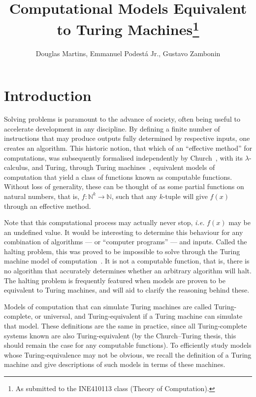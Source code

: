 \documentclass[12pt]{article}
\title{Computational Models Equivalent to Turing Machines\footnote{
    As submitted to the INE410113 class (Theory of Computation).}}
\author{Douglas Martins\inst{1}, Emmanuel Podestá Jr.\inst{1}, Gustavo Zambonin\inst{1}}
\begin{document}
 

\maketitle

\section{Introduction}\label{sec:intro}
 
Solving problems is paramount to the advance of society, often being useful to accelerate development in any discipline. By defining a finite number of instructions that may produce outputs fully determined by respective inputs, one creates an algorithm. This historic notion, that which of an ``effective method'' for computations, was subsequently formalised independently by Church~\cite{}, with its $\lambda$-calculus, and Turing, through Turing machines~\cite{}, equivalent models of computation that yield a class of functions known as computable functions. Without loss of generality, these can be thought of as some partial functions on natural numbers, that is, $f : \mathbb{N}^{k} \rightarrow \mathbb{N}$, such that any $k$-tuple will give $f(x)$ through an effective method. 

Note that this computational process may actually never stop, \emph{i.e.} $f(x)$ may be an undefined value. It would be interesting to determine this behaviour for any combination of algorithms --- or ``computer programs'' --- and inputs. Called the halting problem, this was proved to be impossible to solve through the Turing machine model of computation~\cite{}. It is not a computable function, that is, there is no algorithm that accurately determines whether an arbitrary algorithm will halt. The halting problem is frequently featured when models are proven to be equivalent to Turing machines, and will aid to clarify the reasoning behind these.

Models of computation that can simulate Turing machines are called Turing-complete, or universal, and Turing-equivalent if a Turing machine can simulate that model. These definitions are the same in practice, since all Turing-complete systems known are also Turing-equivalent (by the Church--Turing thesis, this should remain the case for any computable functions). To efficiently study models whose Turing-equivalence may not be obvious, we recall the definition of a Turing machine and give descriptions of such models in terms of these machines.
\end{document}
